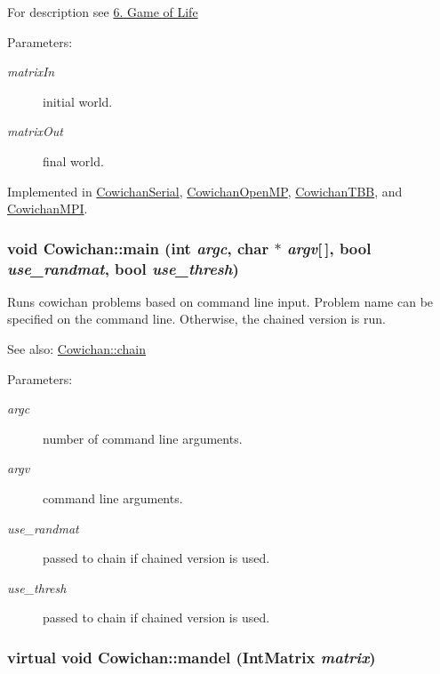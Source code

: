 For description see \hyperlink{index_life_sec}{6. Game of Life} \begin{Desc}
\item[Parameters:]
\begin{description}
\item[{\em matrixIn}]initial world. \item[{\em matrixOut}]final world. \end{description}
\end{Desc}


Implemented in \hyperlink{class_cowichan_serial_ffd5b022c1d24226e11924094d8af349}{CowichanSerial}, \hyperlink{class_cowichan_open_m_p_d24f3ef01289b8f1bd7b864f585daa62}{CowichanOpenMP}, \hyperlink{class_cowichan_t_b_b_273e3e8a2e05108f59ec613472bfa363}{CowichanTBB}, and \hyperlink{class_cowichan_m_p_i_9c739951d036ef7905bda7cb896e0edf}{CowichanMPI}.\hypertarget{class_cowichan_905f3eb45f21cdaa1c32a421d001fa4c}{
\subsubsection[{main}]{\setlength{\rightskip}{0pt plus 5cm}void Cowichan::main (int {\em argc}, \/  char $\ast$ {\em argv}\mbox{[}$\,$\mbox{]}, \/  bool {\em use\_\-randmat}, \/  bool {\em use\_\-thresh})}}
\label{class_cowichan_905f3eb45f21cdaa1c32a421d001fa4c}


Runs cowichan problems based on command line input. Problem name can be specified on the command line. Otherwise, the chained version is run. \begin{Desc}
\item[See also:]\hyperlink{class_cowichan_08ee88eb612571e8faa20b2645dc906d}{Cowichan::chain} \end{Desc}
\begin{Desc}
\item[Parameters:]
\begin{description}
\item[{\em argc}]number of command line arguments. \item[{\em argv}]command line arguments. \item[{\em use\_\-randmat}]passed to chain if chained version is used. \item[{\em use\_\-thresh}]passed to chain if chained version is used. \end{description}
\end{Desc}
\hypertarget{class_cowichan_ec6cc4eb2ad444474b923532167e98a2}{
\subsubsection[{mandel}]{\setlength{\rightskip}{0pt plus 5cm}virtual void Cowichan::mandel ({\bf IntMatrix} {\em matrix})}}
\label{class_cowichan_ec6cc4eb2ad444474b923532167e98a2}


